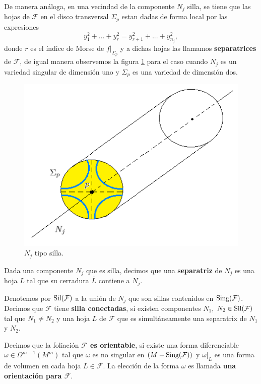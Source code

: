 \documentclass[a4paper,10pt]{book}
\begin{document}
De manera an\'aloga, en una vecindad de la componente $N_{j}$ silla, se tiene que las hojas de $\mathcal{F}$ en el disco transversal $\Sigma_{p}$ estan dadas de forma local por las expresiones 
$$y^{2}_{1}+...+y^{2}_{r}=y^{2}_{r+1}+...+y^{2}_{n_{j}},$$ 
donde $r$ es el \'indice de Morse de $f|_{\Sigma_{p}}$ y a dichas hojas las llamamos {\bfseries separatrices} de $\mathcal{F}$, de igual manera observemos la figura \ref{silla} para el caso cuando $N_{j}$ es un variedad singular de dimensi\'on uno y $\Sigma_{p}$ es una variedad de dimensi\'on dos.

\begin{figure}[!ht]
\centering
\includegraphics[scale=0.6]{silla.png}
\caption{$N_{j}$ tipo silla.}
\label{silla}
\end{figure}

Dada una componente $N_{j}$ que es silla, decimos que una {\bfseries separatriz} de $N_{j}$ es una hoja $L$ tal que su cerradura $\bar{L}$ contiene a $N_{j}$. 
\vspace{5mm}

Denotemos por ${\rm Sil(\mathcal{F})}$ a la uni\'on de $N_{j}$ que son sillas contenidos en ${\rm Sing(\mathcal{F})}$. Decimos que $\mathcal{F}$ tiene  {\bfseries silla conectadas}, si existen componentes $N_{1}$, $N_{2}\in{\rm Sil(\mathcal{F})}$ tal que $N_{1}\neq N_{2}$ y una hoja $L$ de $\mathcal{F}$ que es simult\'aneamente una separatrix de $N_{1}$ y $N_{2}$. 
\vspace{5mm}

Decimos que la foliaci\'on {\bfseries $\mathcal{F}$ es orientable}, si existe una forma diferenciable   $\omega\in\Omega^{m-1}(M^{m})$ tal que $\omega$ es no singular en $(M-{\rm Sing(\mathcal{F})})$ y $\omega|_{L}$ es una forma de volumen en cada hoja $L\in\mathcal{F}$. La elecci\'on de la forma $\omega$ es llamada {\bfseries una orientaci\'on para $\mathcal{F}$}.  
\vspace{5mm}
\end{document}
